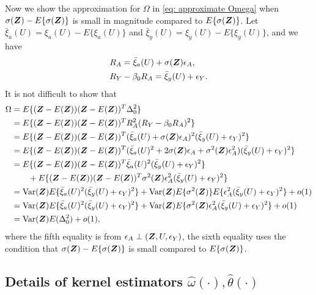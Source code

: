 \documentclass[12pt]{article}
\begin{document}
{Now we show the approximation  for $\Omega$ in \eqref{eq: approximate Omega}  when  $\sigma(\bm{Z}) - E\{\sigma(\bm{Z})\} $ is small in magnitude compared to $E\{\sigma(\bm{Z})\}$.  Let $\bar\xi_a(U)= \xi_a(U) - E\{ \xi_a(U)\}$ and $\bar\xi_y(U)= \xi_y(U) - E\{ \xi_y(U)\}$, and we have 
\begin{align*}
	&R_A= \bar\xi_a(U)+ \sigma(\bm{Z}) \epsilon_A,\\
	&R_{Y} - \beta_0 R_A= \bar\xi_y(U)+  \epsilon_Y.
\end{align*}
It is not difficult to show that 
\begin{align*}
	\Omega&= E\{(\bm{Z}- E(\bm{Z}))(\bm{Z}- E(\bm{Z}))^T\Delta_0^2\}\\
	&=  E\{(\bm{Z}- E(\bm{Z}))(\bm{Z}- E(\bm{Z}))^TR_A^2 (R_Y- \beta_0 R_A)^2\}   \\
	&=  E\{(\bm{Z}- E(\bm{Z}))(\bm{Z}- E(\bm{Z}))^T(\bar\xi_a(U)+ \sigma(\bm{Z}) \epsilon_A)^2 (\bar\xi_y(U)+  \epsilon_Y )^2\}   \\
	&= E\{(\bm{Z}- E(\bm{Z}))(\bm{Z}- E(\bm{Z}))^T(\bar\xi_a(U)^2+ 2\sigma(\bm{Z}) \epsilon_A + \sigma^2(\bm{Z}) \epsilon_A^2) (\bar\xi_y(U)+  \epsilon_Y )^2\}   \\
	&= E\{(\bm{Z}- E(\bm{Z}))(\bm{Z}- E(\bm{Z}))^T \bar\xi_a(U)^2 (\bar\xi_y(U)+  \epsilon_Y )^2\}  \\
	&\qquad +  E\{(\bm{Z}- E(\bm{Z}))(\bm{Z}- E(\bm{Z}))^T \sigma^2(\bm{Z}) \epsilon_A^2 (\bar\xi_y(U)+  \epsilon_Y )^2\}  \\
	&= \mbox{Var}(\bm{Z}) E\{\bar\xi_a(U)^2 (\bar\xi_y(U)+  \epsilon_Y )^2\}   + \mbox{Var}(\bm{Z}) E\{\sigma^2(\bm{Z})\}  E\{\epsilon_A^2 (\bar\xi_y(U)+  \epsilon_Y )^2\} +o(1) \\
	&= \mbox{Var}(\bm{Z}) E\{\bar\xi_a(U)^2 (\bar\xi_y(U)+  \epsilon_Y )^2\}   + \mbox{Var}(\bm{Z}) E\{\sigma^2(\bm{Z}) \epsilon_A^2 (\bar\xi_y(U)+  \epsilon_Y )^2\} +o(1) \\
	&=  \mbox{Var}(\bm{Z}) E(\Delta_0^2) + o(1),
\end{align*}
where the fifth equality is from $ \epsilon_A \perp (\bm{Z}, U, \epsilon_Y) $, the sixth equality uses the condition that $ \sigma(\bm{Z})- E\{ \sigma(\bm{Z}) \}  $ is small compared to $ E\{ \sigma(\bm{Z}) \}  $.




\subsection{Details of kernel estimators $ \hat \omega(\cdot), \hat \theta(\cdot)$}



}
\end{document}
